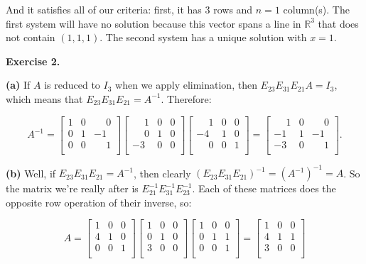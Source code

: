 \documentclass{article}
\begin{document}
And it satisfies all of our criteria: first, it has 3 rows and $n = 1$ column(s). The first system will have no solution because this vector spans a line in $\mathbb{R}^{3}$ that does not contain $(1, 1, 1)$. The second system has a unique solution with $x = 1$.

\noindent \textbf{Exercise 2.}

\noindent \textbf{(a)} If $A$ is reduced to $I_3$ when we apply elimination, then $E_{23}E_{31}E_{21}A = I_3$, which means that $E_{23}E_{31}E_{21} = A^{-1}$. Therefore:

\[
A^{-1}
=
\begin{bmatrix}
1 & 0 & \phantom{-}0\\
0 & 1 & -1\\
0 & 0 & \phantom{-}1\\
\end{bmatrix}
\begin{bmatrix}
\phantom{-}1 & 0 & 0\\
\phantom{-}0 & 1 & 0\\
-3 & 0 & 0\\
\end{bmatrix}
\begin{bmatrix}
\phantom{-}1 & 0 & 0\\
-4 & 1 & 0\\
\phantom{-}0 & 0 & 1\\
\end{bmatrix}
=
\begin{bmatrix}
\phantom{-}1 & 0 & \phantom{-}0\\
-1  & 1 & -1\\
-3  & 0  & \phantom{-}1\\
\end{bmatrix}.
\]

\noindent \textbf{(b)} Well, if $E_{23}E_{31}E_{21} = A^{-1}$, then clearly $(E_{23}E_{31}E_{21})^{-1} = (A^{-1})^{-1} = A$. So the matrix we're really after is $E_{21}^{-1}E_{31}^{-1}E_{23}^{-1}$. Each of these matrices does the opposite row operation of their inverse, so:

\[
A =
\begin{bmatrix}
1 & 0 & 0\\
4 & 1 & 0\\
0 & 0 & 1\\
\end{bmatrix}
\begin{bmatrix}
1 & 0 & 0\\
0 & 1 & 0\\
3 & 0 & 0\\
\end{bmatrix}
\begin{bmatrix}
1 & 0 & 0\\
0 & 1 & 1\\
0 & 0 & 1\\
\end{bmatrix}
=
\begin{bmatrix}
1 & 0 & 0\\
4 & 1 & 1\\
3 & 0 & 0\\
\end{bmatrix}
\]
\end{document}
